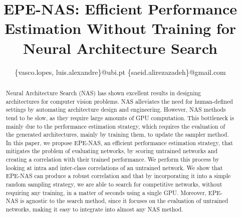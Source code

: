 \documentclass[10pt, conference]{IEEEtran}
\begin{document}
\title{EPE-NAS: Efficient Performance Estimation Without Training for Neural Architecture Search} 



\newcommand\blfootnote[1]{\begingroup
  \renewcommand\thefootnote{}\footnote{#1}\addtocounter{footnote}{-1}\endgroup
}

\author{
\{vasco.lopes, luis.alexandre\}@ubi.pt \qquad \{saeid.alirezazadeh\}@gmail.com
}




\newcommand{\ver}[1]{{\color{red}!!! #1 !!!}}  

\maketitle



\begin{abstract}
Neural Architecture Search (NAS) has shown excellent results in designing architectures for computer vision problems. NAS alleviates the need for human-defined settings by automating architecture design and engineering. However, NAS methods tend to be slow, as they require large amounts of GPU computation. This bottleneck is mainly due to the performance estimation strategy, which requires the evaluation of the generated architectures, mainly by training them, to update the sampler method. In this paper, we propose EPE-NAS, an efficient performance estimation strategy, that mitigates the problem of evaluating networks, by scoring untrained networks and creating a correlation with their trained performance. We perform this process by looking at intra and inter-class correlations of an untrained network. We show that EPE-NAS can produce a robust correlation and that by incorporating it into a simple random sampling strategy, we are able to search for competitive networks, without requiring any training, in a matter of seconds using a single GPU. Moreover, EPE-NAS is agnostic to the search method, since it focuses on the evaluation of untrained networks, making it easy to integrate into almost any NAS method.
\end{abstract}
\end{document}

